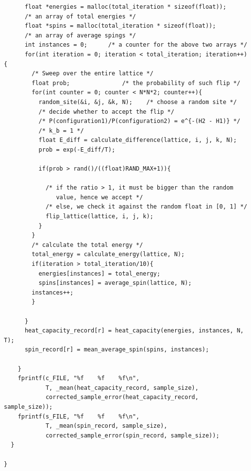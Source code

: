 \documentclass{article}
\begin{document}
\begin{verbatim}
      float *energies = malloc(total_iteration * sizeof(float));
      /* an array of total energies */
      float *spins = malloc(total_iteration * sizeof(float));
      /* an array of average spings */
      int instances = 0;      /* a counter for the above two arrays */
      for(int iteration = 0; iteration < total_iteration; iteration++){
        /* Sweep over the entire lattice */
        float prob;               /* the probability of such flip */
        for(int counter = 0; counter < N*N*2; counter++){
          random_site(&i, &j, &k, N);    /* choose a random site */
          /* decide whether to accept the flip */
          /* P(configuration1)/P(configuration2) = e^{-(H2 - H1)} */
          /* k_b = 1 */
          float E_diff = calculate_difference(lattice, i, j, k, N);
          prob = exp(-E_diff/T);

          if(prob > rand()/((float)RAND_MAX+1)){

            /* if the ratio > 1, it must be bigger than the random
               value, hence we accept */
            /* else, we check it against the random float in [0, 1] */
            flip_lattice(lattice, i, j, k);
          }
        }
        /* calculate the total energy */
        total_energy = calculate_energy(lattice, N);
        if(iteration > total_iteration/10){
          energies[instances] = total_energy;
          spins[instances] = average_spin(lattice, N);
        instances++;
        }

      }
      heat_capacity_record[r] = heat_capacity(energies, instances, N, T);
      spin_record[r] = mean_average_spin(spins, instances);

    }
    fprintf(c_FILE, "%f    %f    %f\n",
            T, _mean(heat_capacity_record, sample_size),
            corrected_sample_error(heat_capacity_record, sample_size));
    fprintf(s_FILE, "%f    %f    %f\n",
            T, _mean(spin_record, sample_size),
            corrected_sample_error(spin_record, sample_size));
  }

}
\end{verbatim}

\hline
\end{document}
